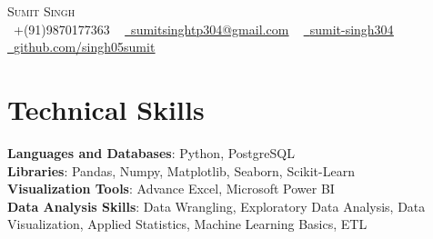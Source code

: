 \documentclass[letterpaper,11pt]{article}
\begin{document}

\begin{center}
    {\Huge \scshape Sumit Singh} \\ \vspace{5pt}
     \vspace{1pt}
    \small \raisebox{-0.1\height}\faPhone\ +(91)9870177363 ~ \href{mailto:sumitsinghtp304@gmail.com}{\raisebox{-0.2\height}\faEnvelope\  \underline{sumitsinghtp304@gmail.com}} ~ 
    \href{https://linkedin.com/in/sumit-singh304/}{\raisebox{-0.2\height}\faLinkedin\ \underline{sumit-singh304}}  ~
    \href{https://github.com/singh05sumit}{\raisebox{-0.2\height}\faGithub\ \underline{github.com/singh05sumit}}
    \vspace{-8pt}
\end{center}\vspace{+10pt}


\section{Technical Skills}
\vspace{2pt}
 \begin{itemize}[leftmargin=0.15in, label={}]
    \small{\item{
     \textbf{Languages and Databases}{: Python, PostgreSQL} \\
     \vspace{4pt}
     \textbf{Libraries}{: Pandas, Numpy, Matplotlib, Seaborn, Scikit-Learn} \\
     \vspace{4pt}
     \textbf{Visualization Tools}{: Advance Excel, Microsoft Power BI} \\
     \vspace{4pt}
     \textbf{Data Analysis Skills}{: Data Wrangling, Exploratory Data Analysis, Data Visualization, Applied Statistics, Machine Learning Basics, ETL}
    }}
 \end{itemize}
 
\end{document}

